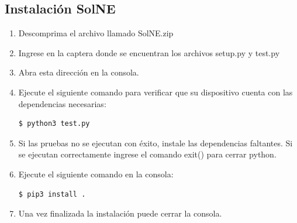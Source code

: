 \documentclass[12pt]{article}
\begin{document}
\subsection{Instalación SolNE}
\begin{enumerate}
	\item Descomprima el archivo llamado SolNE.zip
	\item Ingrese en la captera donde se encuentran los archivos setup.py y test.py
	\item Abra esta dirección en la consola.
	\item Ejecute el siguiente comando para verificar que su dispositivo cuenta con las dependencias necesarias:
\begin{lstlisting}[language=bash]
  $ python3 test.py
\end{lstlisting}
	\item Si las pruebas no se ejecutan con éxito, instale las dependencias faltantes. Si se ejecutan correctamente ingrese el comando exit() para cerrar python.
	\item Ejecute el siguiente comando en la consola:
\begin{lstlisting}[language=bash]
  $ pip3 install .
\end{lstlisting}
	\item Una vez finalizada la instalación puede cerrar la consola.
\end{enumerate}
\end{document}

